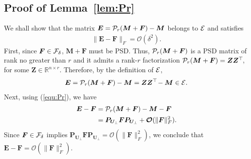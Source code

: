 \documentclass{article}
\def\P{{\cal P}}
\def\E{{\cal E}}
\def\F{{\cal F}}
\def\R{{\mathbb R}}
\newcommand{\norm}[1]{\|#1\|} %
\newcommand{\topnew}{\top \hspace{-0.05cm}}
\begin{document}
\subsection{Proof of Lemma~\ref{lem:Pr}}
We shall show that the matrix $\bm E = \P_r(\bm M + \bm F) - \bm M$ belongs to $\E$ and satisfies 
\begin{align} \label{equ:EF}
    \norm{\bm E - \bm F}_F = \mathcal{O}(\delta^2) .
\end{align}
First, since $\bm F \in \F_\delta$, $\bm M + \bm F$ must be PSD. Thus, $\P_r(\bm M + \bm F)$ is a PSD matrix of rank no greater than $r$ and it admits a rank-$r$ factorization $\P_r(\bm M + \bm F) = \bm Z \bm Z^\topnew$, for some $\bm Z \in \R^{n \times r}$. Therefore, by the definition of $\E$,
$$ \bm E = \P_r(\bm M + \bm F) - \bm M = \bm Z \bm Z^\topnew - \bm M \in \E .$$
Next, using (\ref{equ:Pr}), we have
\begin{align*}
    \bm E - \bm F &= \P_r(\bm M + \bm F) - \bm M - \bm F \\
    &= \bm P_{\bm U_\perp} \bm F \bm P_{\bm U_\perp} + \bm{\mathcal{O}}(\norm{\bm F}_F^2) .
\end{align*}
Since $\bm F \in \F_\delta$ implies $\bm P_{\bm U_\perp} \bm F \bm P_{\bm U_\perp} = \bm{\mathcal{O}}(\norm{\bm F}_F^2)$, we conclude that $\bm E - \bm F = \bm{\mathcal{O}}(\norm{\bm F}_F^2)$.






























\end{document}
